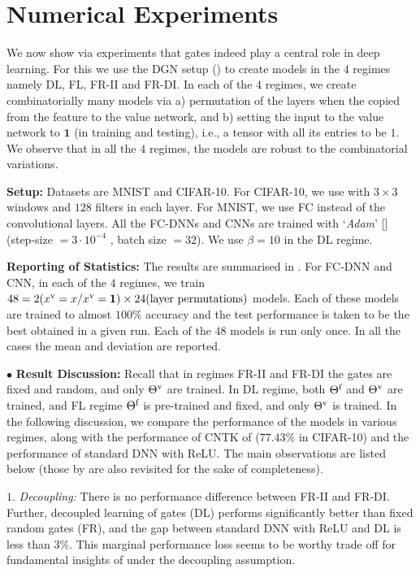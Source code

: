 \section{Numerical Experiments}\label{sec:exp} 
We  now show via experiments that gates indeed play a central role in deep learning. For this we use the DGN setup () to create models in the $4$ regimes namely DL, FL, FR-II and FR-DI. In each of the $4$ regimes, we create  combinatorially many models via a) permutation of the layers when the copied from the feature to the value network, and b) setting the input to the value network to $\mathbf{1}$ (in training and testing), i.e., a tensor with all its entries to be $1$. We observe that in all the $4$ regimes, the models are robust to the combinatorial variations.

\textbf{Setup:} Datasets are MNIST and CIFAR-10. For CIFAR-10, we use  with $3\times 3$  windows and $128$ filters in each layer. For MNIST, we use FC instead of the convolutional layers.  All the FC-DNNs and CNNs are trained with `\emph{Adam}'  [] (step-size $=3\cdot 10^{-4}$ , batch size $=32$). We use $\beta=10$ in the DL regime.

\textbf{Reporting of Statistics:} The results are summarised in . For FC-DNN and CNN, in each of the $4$ regimes, we train $48= 2 (x^{\text{v}}=x / x^{\text{v}}=\mathbf{1}) \times 24(\text{layer permutations})$ models. Each of these models are trained to almost $100\%$ accuracy and the test performance is taken to be the best obtained in a given run. Each of the $48$ models is run only once. In all the cases the mean and deviation are reported.


$\bullet$ \textbf{Result Discussion:}  Recall that in regimes FR-II and FR-DI the gates are fixed and random, and only ${\Theta}^{\text{v}}$ are trained. In DL regime, both $\Theta^{\textrm{f}}$ and ${\Theta}^{\text{v}}$ are trained, and FL regime $\Theta^{\textrm{f}}$ is pre-trained and fixed, and only ${\Theta}^{\text{v}}$ is trained. In the following discussion, we compare the performance of the models in various regimes, along with the performance of CNTK of \cite{arora2019exact} ($77.43\%$ in CIFAR-10) and the performance of standard DNN with ReLU.  The main observations are listed below (those by \cite{npk} are also revisited for the sake of completeness). 

\indent\quad $1.$ \emph{Decoupling:} There is no performance difference between FR-II and FR-DI.%
Further, decoupled learning of gates (DL) performs significantly better than fixed random gates (FR), and the gap between standard DNN with ReLU and DL is less than $3\%$. This marginal performance loss seems to be worthy trade off for fundamental insights of  under the decoupling assumption.

